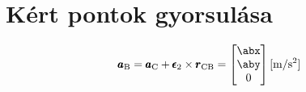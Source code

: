 \section{Kért pontok gyorsulása}

\begin{equation}
	\pmb{a}_\text{B} = \pmb{a}_\text{C} + \pmb{\epsilon}_2 \times \pmb{r}_\text{CB} =
	\begin{bmatrix}
		\abx \\ \aby \\ 0
	\end{bmatrix} \siunit{}{\m\per\second^2}
\end{equation}
